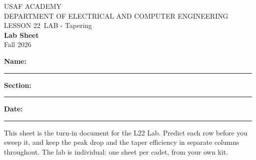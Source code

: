 \documentclass{exam}
\def\labLesson{22}
\def\thisterm{\thisTermIn}
\def\thisterm{Fall 2026}
\begin{document}
\pagestyle{headandfoot}   %



\begin{center}
USAF ACADEMY \\
DEPARTMENT OF ELECTRICAL AND COMPUTER ENGINEERING \\
LESSON \labLesson\ LAB - Tapering \\
\textbf{Lab Sheet} \\
\thisterm \\[4mm]
\end{center}

\vspace{-4pt}
\textbf{Name:} \rule[-2pt]{2.6in}{0.4pt} \hfill
\textbf{Section:} \rule[-2pt]{0.9in}{0.4pt} \hfill
\textbf{Date:} \rule[-2pt]{1.1in}{0.4pt}

\vspace{4pt}


\vspace{2pt}

This sheet is the turn-in document for the L22 Lab. Predict each row
before you sweep it, and keep the peak drop and the taper efficiency in separate
columns throughout. The lab is individual: one sheet per cadet, from your own kit.
\end{document}
